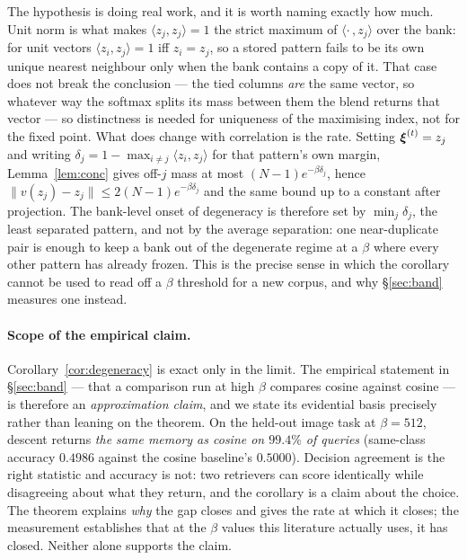 The hypothesis is doing real work, and it is worth naming exactly how much. Unit norm is
what makes $\langle z_j,z_j\rangle = 1$ the strict maximum of $\langle \cdot\,,z_j\rangle$
over the bank: for unit vectors $\langle z_i,z_j\rangle = 1$ iff $z_i = z_j$, so a stored
pattern fails to be its own unique nearest neighbour only when the bank contains a copy of
it. That case does not break the conclusion --- the tied columns \emph{are} the same vector,
so whatever way the softmax splits its mass between them the blend returns that vector --- so
distinctness is needed for uniqueness of the maximising index, not for the fixed point. What
does change with correlation is the rate. Setting $\boldsymbol{\xi}^{(t)} = z_j$ and writing
$\delta_j = 1 - \max_{i \neq j}\langle z_i,z_j\rangle$ for that pattern's own margin,
Lemma~\ref{lem:conc} gives off-$j$ mass at most $(N{-}1)e^{-\beta\delta_j}$, hence
$\|v(z_j) - z_j\| \le 2(N{-}1)e^{-\beta\delta_j}$ and the same bound up to a constant after
projection. The bank-level onset of degeneracy is therefore set by $\min_j \delta_j$, the
least separated pattern, and not by the average separation: one near-duplicate pair is enough
to keep a bank out of the degenerate regime at a $\beta$ where every other pattern has
already frozen. This is the precise sense in which the corollary cannot be used to read off a
$\beta$ threshold for a new corpus, and why \S\ref{sec:band} measures one instead.

\paragraph{Scope of the empirical claim.} Corollary~\ref{cor:degeneracy} is exact only in
the limit. The empirical statement in \S\ref{sec:band} --- that a comparison run at high
$\beta$ compares cosine against cosine --- is therefore an \emph{approximation claim}, and we
state its evidential basis precisely rather than leaning on the theorem. On the held-out
image task at $\beta{=}512$, descent returns \emph{the same memory as cosine on
$99.4\%$ of queries} (same-class accuracy $0.4986$ against the cosine baseline's
$0.5000$). Decision agreement is the right statistic and accuracy is not: two
retrievers can score identically while disagreeing about what they return, and the
corollary is a claim about the choice. The theorem explains \emph{why} the gap closes and gives the rate
at which it closes; the measurement establishes that at the $\beta$ values this literature
actually uses, it has closed. Neither alone supports the claim.

